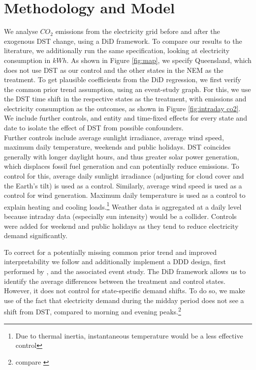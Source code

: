\section{Methodology and Model}

We analyse $CO_2$ emissions from the electricity grid before and after the exogenous \ac{DST} change, using a \acf{DiD} framework. To compare our results to the literature, we additionally run the same specification, looking at electricity consumption in $kWh$. As shown in Figure \ref{fig:map}, we specify Queensland, which does not use \ac{DST} as our control and the other states in the \ac{NEM} as the treatment. To get plausible coefficients from the \ac{DiD} regression, we first verify the common prior trend assumption, using an event-study graph.
For this, we use the \ac{DST} time shift in the respective states as the treatment, with emissions and electricity consumption as the outcomes, as shown in Figure \ref{fig:intraday co2}. We include further controls, and entity and time-fixed effects for every state and date to isolate the effect of \ac{DST} from possible confounders. \\ 
Further controls include average sunlight irradiance, average wind speed, maximum daily temperature, weekends and public holidays. \ac{DST} coincides generally with longer daylight hours, and thus greater solar power generation, which displaces fossil fuel generation and can potentially reduce emissions. To control for this, average daily sunlight irradiance (adjusting for cloud cover and the Earth's tilt) is used as a control. Similarly, average wind speed is used as a control for wind generation. Maximum daily temperature is used as a control to explain heating and cooling loads.\footnote{Due to thermal inertia, instantaneous temperature would be a less effective control} Weather data is aggregated at a daily level because intraday data (especially sun intensity) would be a collider. %
Controls were added for weekend and public holidays as they tend to reduce electricity demand significantly.

To correct for a potentially missing common prior trend and improved interpretability we follow \textcite{kellogg_daylight_2008} and additionally implement a \ac{DDD} design, first performed by \textcite{gruber_incidence_1994}, and the associated event study. The \ac{DiD} framework allows us to identify the average differences between the treatment and control states. However, it does not control for state-specific demand shifts. To do so, we make use of the fact that electricity demand during the midday period does not see a shift from DST, compared to morning and evening peaks.\footnote{compare \textcite{kellogg_daylight_2008}}


